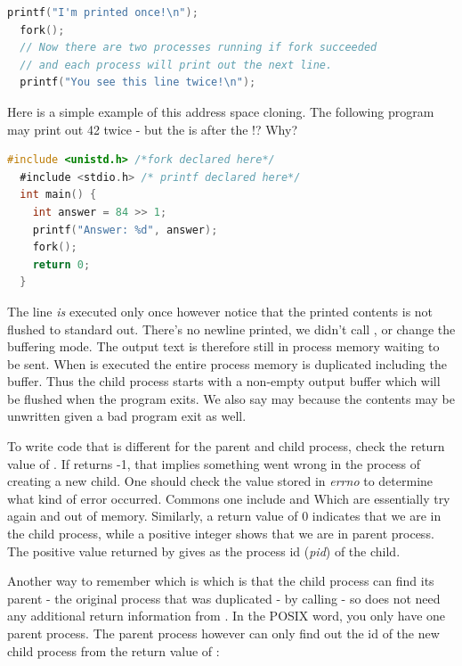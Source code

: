 \begin{lstlisting}[language=C]
  printf("I'm printed once!\n");
  fork();
  // Now there are two processes running if fork succeeded
  // and each process will print out the next line.
  printf("You see this line twice!\n");
\end{lstlisting}

Here is a simple example of this address space cloning.
The following program may print out 42 twice - but the  is after the !? Why?

\begin{lstlisting}[language=C]
  #include <unistd.h> /*fork declared here*/
  #include <stdio.h> /* printf declared here*/
  int main() {
    int answer = 84 >> 1;
    printf("Answer: %d", answer);
    fork();
    return 0;
  }
\end{lstlisting}

The  line \emph{is} executed only once however notice that the printed contents is not flushed to standard out.
There's no newline printed, we didn't call , or change the buffering mode.
The output text is therefore still in process memory waiting to be sent.
When  is executed the entire process memory is duplicated including the buffer.
Thus the child process starts with a non-empty output buffer which will be flushed when the program exits.
We also say may because the contents may be unwritten given a bad program exit as well.

To write code that is different for the parent and child process, check the return value of .
If  returns -1, that implies something went wrong in the process of creating a new child.
One should check the value stored in \emph{errno} to determine what kind of error occurred.
Commons one include  and  Which are essentially try again and out of memory.
Similarly, a return value of 0 indicates that we are in the child process, while a positive integer shows that we are in parent process.
The positive value returned by  gives as the process id (\emph{pid}) of the child.

Another way to remember which is which is that the child process can find its parent - the original process that was duplicated - by calling  - so does not need any additional return information from .
In the POSIX word, you only have one parent process.
The parent process however can only find out the id of the new child process from the return value of :

